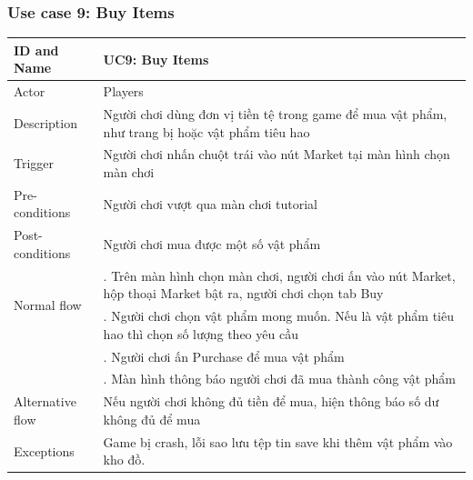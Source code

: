\subsubsection{Use case 9: Buy Items}
\begin{center}
	\begin{tabular}{|l|p{12cm}|}
		\hline
		ID and Name & UC9: Buy Items \\
		\hline
		Actor  & Players \\
		\hline
		Description  & Người chơi dùng đơn vị tiền tệ trong game để mua vật phẩm, như trang bị hoặc vật phẩm tiêu hao\\
		\hline
		Trigger  & Người chơi nhấn chuột trái vào nút Market tại màn hình chọn màn chơi\\
		\hline
		Pre-conditions & Người chơi vượt qua màn chơi tutorial\\
		\hline
		Post-conditions & Người chơi mua được một số vật phẩm\\
		\hline
		\multirow{2}{*}{Normal flow}      &\qquad 1. Trên màn hình chọn màn chơi, người chơi ấn vào nút Market, hộp thoại Market bật ra, người chơi chọn tab Buy\\
		&\qquad 2. Người chơi chọn vật phẩm mong muốn. Nếu là vật phẩm tiêu hao thì chọn số lượng theo yêu cầu\\
		&\qquad 3. Người chơi ấn Purchase để mua vật phẩm\\
		&\qquad 4. Màn hình thông báo người chơi đã mua thành công vật phẩm\\
		\hline
		Alternative flow  & Nếu người chơi không đủ tiền để mua, hiện thông báo số dư không đủ để mua\\
		\hline
		Exceptions  & Game bị crash, lỗi sao lưu tệp tin save khi thêm vật phẩm vào kho đồ.\\
		\hline
	\end{tabular}
\end{center}
